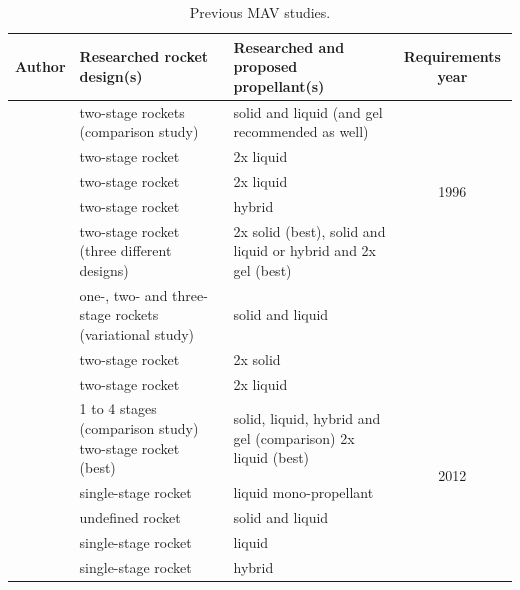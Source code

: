\begin{table}[H]
\begin{center}
\caption{Previous \ac{MAV} studies.}
\label{tab:refmavstud}
\begin{tabularx}{1.0\textwidth}{|X|X|X|c|}
\hline 
\textbf{Author} 		 &\textbf{Researched rocket design(s)} & \textbf{Researched and proposed propellant(s)} & \textbf{Requirements year} \\ \hline \hline
\cite{whitehead1997} 		& two-stage rockets (comparison study)  & solid and liquid (and gel recommended as well) & \multirow{5}{*}{1996} \\ \cline{1-3}
\cite{guernsey1998} 		& two-stage rocket & 2x liquid &  \\ \cline{1-3}
\cite{desai1998} 	& two-stage rocket & 2x liquid  & \\ \cline{1-3}
\cite{stone1999} 	& two-stage rocket & hybrid & \\ \hline \hline
\cite{stephenson2002} 		& two-stage rocket (three different designs) & 2x solid (best), solid and liquid or hybrid and 2x gel (best)  & \multirow{8}{*}{2000} \\ \cline{1-3}
\cite{whitehead2005} 		& one-, two- and three-stage rockets (variational study)  & solid and liquid  & \\ \cline{1-3}
\cite{stephenson2006} & two-stage rocket & 2x solid & \\ \hline \hline
\cite{sengupta2012} 		& two-stage rocket & 2x liquid  & \multirow{7}{*}{2012} \\ \cline{1-3}
\cite{trinidad2012} 		& 1 to 4 stages (comparison study) two-stage rocket (best)  & solid, liquid, hybrid and gel (comparison) 2x liquid (best) & \\ \cline{1-3}
\cite{mungas2012}	& single-stage rocket & liquid mono-propellant  &  \\ \cline{1-3}
\cite{mppg2012}	 & undefined rocket & solid and liquid & \\ \hline \hline
\cite{vaughan2016technology} & single-stage rocket & liquid & \multirow{2}{*}{2014} \\ \cline{1-3}
\cite{karp2016technology} & single-stage rocket & hybrid & \\ \hline
 		
\end{tabularx}
\end{center}
\end{table} 

